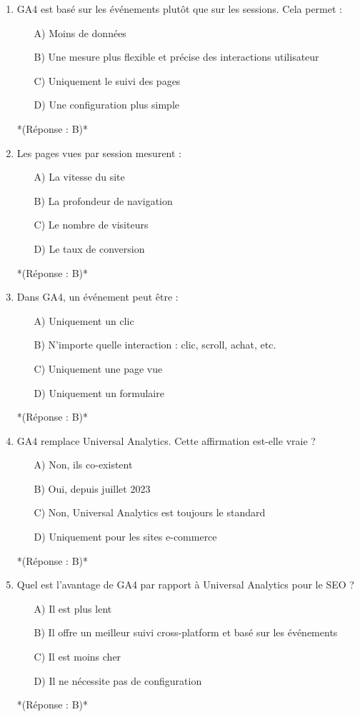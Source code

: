 \documentclass[12pt,a4paper,twoside]{report}
\begin{document}
\begin{enumerate}
    \item GA4 est basé sur les événements plutôt que sur les sessions. Cela permet :
    \begin{itemize}
        \item[A)] Moins de données
        \item[B)] Une mesure plus flexible et précise des interactions utilisateur
        \item[C)] Uniquement le suivi des pages
        \item[D)] Une configuration plus simple
    \end{itemize}
    *(Réponse : B)*

    \item Les pages vues par session mesurent :
    \begin{itemize}
        \item[A)] La vitesse du site
        \item[B)] La profondeur de navigation
        \item[C)] Le nombre de visiteurs
        \item[D)] Le taux de conversion
    \end{itemize}
    *(Réponse : B)*

    \item Dans GA4, un événement peut être :
    \begin{itemize}
        \item[A)] Uniquement un clic
        \item[B)] N'importe quelle interaction : clic, scroll, achat, etc.
        \item[C)] Uniquement une page vue
        \item[D)] Uniquement un formulaire
    \end{itemize}
    *(Réponse : B)*

    \item GA4 remplace Universal Analytics. Cette affirmation est-elle vraie ?
    \begin{itemize}
        \item[A)] Non, ils co-existent
        \item[B)] Oui, depuis juillet 2023
        \item[C)] Non, Universal Analytics est toujours le standard
        \item[D)] Uniquement pour les sites e-commerce
    \end{itemize}
    *(Réponse : B)*

    \item Quel est l'avantage de GA4 par rapport à Universal Analytics pour le SEO ?
    \begin{itemize}
        \item[A)] Il est plus lent
        \item[B)] Il offre un meilleur suivi cross-platform et basé sur les événements
        \item[C)] Il est moins cher
        \item[D)] Il ne nécessite pas de configuration
    \end{itemize}
    *(Réponse : B)*


\end{enumerate}
\end{document}
